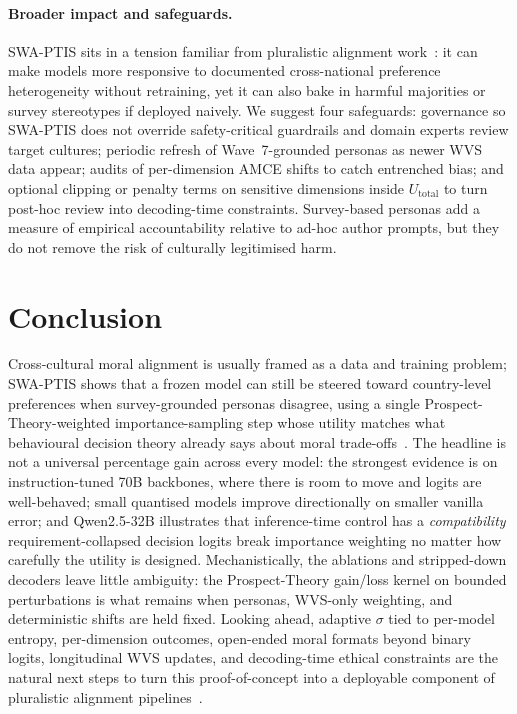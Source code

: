 \documentclass{article}
\begin{document}
\paragraph{Broader impact and safeguards.}
SWA-PTIS sits in a tension familiar from pluralistic alignment
work~\citep{sorensen2024roadmap}: it can make models more responsive to
documented cross-national preference heterogeneity without retraining, yet it
can also bake in harmful majorities or survey stereotypes if deployed naively.
We suggest four safeguards: governance so SWA-PTIS does not override
safety-critical guardrails and domain experts review target cultures; periodic
refresh of Wave~7-grounded personas as newer WVS data appear; audits of
per-dimension AMCE shifts to catch entrenched bias; and optional clipping or
penalty terms on sensitive dimensions inside $U_{\text{total}}$ to turn
post-hoc review into decoding-time constraints.
Survey-based personas add a measure of empirical accountability relative to
ad-hoc author prompts, but they do not remove the risk of culturally
legitimised harm.

\section{Conclusion}
\label{sec:conclusion}

Cross-cultural moral alignment is usually framed as a data and training
problem; SWA-PTIS shows that a frozen model can still be steered toward
country-level preferences when survey-grounded personas disagree, using a
single Prospect-Theory-weighted importance-sampling step whose utility matches what
behavioural decision theory already says about moral trade-offs~\citep{kahneman1979prospect}.
The headline is not a universal percentage gain across every model: the
strongest evidence is on instruction-tuned 70B backbones, where there is room
to move and logits are well-behaved; small quantised models improve
directionally on smaller vanilla error; and Qwen2.5-32B illustrates that
inference-time control has a \emph{compatibility} requirement-collapsed
decision logits break importance weighting no matter how carefully the utility
is designed.
Mechanistically, the ablations and stripped-down decoders leave little
ambiguity: the Prospect-Theory gain/loss kernel on bounded perturbations is
what remains when personas, WVS-only weighting, and deterministic shifts are
held fixed.
Looking ahead, adaptive $\sigma$ tied to per-model entropy, per-dimension
outcomes, open-ended moral formats beyond binary logits, longitudinal WVS
updates, and decoding-time ethical constraints are the natural next steps to
turn this proof-of-concept into a deployable component of pluralistic alignment
pipelines~\citep{sorensen2024roadmap}.
\end{document}
